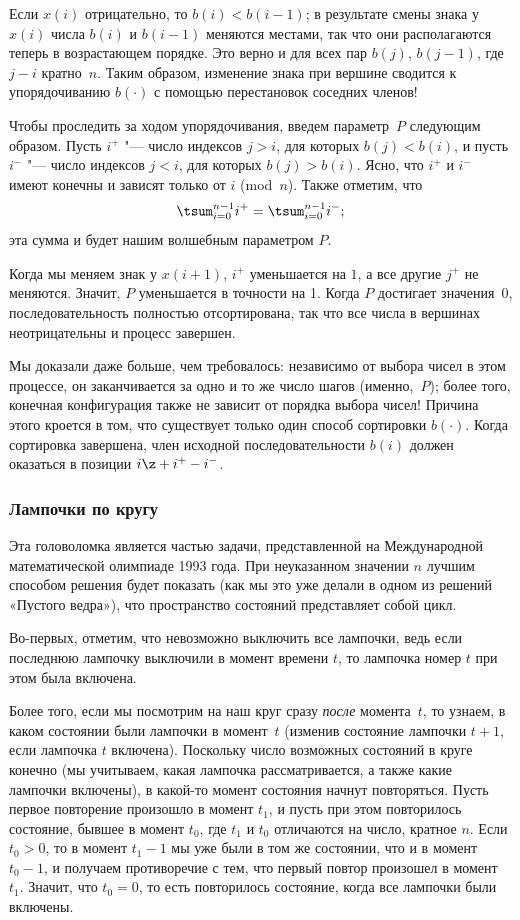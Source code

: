 \documentclass[twoside]{book}
\begin{document}
Если $x(i)$ отрицательно, то $b(i) < b(i-1)$; в результате смены знака
у $x(i)$ числа $b(i)$ и $b(i - 1)$ меняются местами, так что они располагаются теперь в возрастающем порядке.
Это верно и для всех пар $b(j)$, $b(j - 1)$, где $j-i$ кратно~$n$.
Таким образом, изменение знака при вершине сводится к упорядочиванию $b(\cdot)$ с помощью перестановок соседних членов!

Чтобы проследить за ходом упорядочивания, введем параметр~$P$ следующим образом.
Пусть $i^+$ "--- число индексов $j > i$, для которых $b(j) < b(i)$, и
пусть $i^-$ "--- число индексов $j < i$, для которых $b(j) >
b(i)$.
Ясно, что $i^+$ и $i^-$ имеют конечны и зависят только от $i$ (mod~$n$).
Также отметим, что 
\[ \tsum_{i=0}^{n-1}i^+= \tsum_{i=0}^{n-1}i^-;
\]
эта сумма и будет нашим волшебным параметром $P$.

Когда мы меняем знак у $x(i+1)$, $i^+$ уменьшается на $1$, а все другие $j^+$ не меняются.
Значит, $P$ уменьшается в точности на 1.
Когда $P$ достигает значения~$0$, последовательность полностью отсортирована, так что все числа в вершинах неотрицательны и процесс завершен.

Мы доказали даже больше, чем требовалось: независимо от выбора чисел в
этом процессе, он заканчивается за одно и то же число шагов
(именно,~$P$); более того, конечная конфигурация также не зависит от
порядка выбора чисел!  Причина этого кроется в том, что существует
только один способ сортировки $b(\cdot)$.
Когда сортировка завершена,
член исходной последовательности $b(i)$ должен оказаться в позиции $i
\z+ i^+ - i^-$. \heart

\subsubsection*{Лампочки по кругу}%

Эта головоломка является частью задачи, представленной на Международной математической олимпиаде 1993 года.
При неуказанном значении $n$ лучшим способом решения будет показать
(как мы это уже делали в одном из решений «Пустого ведра»), что
пространство состояний представляет собой цикл.

\medskip

Во-первых, отметим, что невозможно выключить все лампочки,
ведь если последнюю лампочку выключили в момент времени $t$, то
лампочка номер $t$ при этом была включена.

Более того, если мы посмотрим на наш круг сразу \emph{после} момента~$t$, то узнаем, в каком состоянии были лампочки в момент~$t$ (изменив состояние лампочки $t+1$, если лампочка $t$ включена).
Поскольку число возможных состояний в круге конечно (мы учитываем,
какая лампочка рассматривается, а также какие лампочки включены),  в
какой-то момент состояния начнут повторяться.
Пусть первое повторение произошло в момент $t_1$, и пусть при этом повторилось состояние, бывшее в момент $t_0$, где $t_1$ и $t_0$ отличаются на число, кратное $n$.
Если $t_0>0$, то в момент $t_1 - 1$ мы уже были в том же состоянии,
что и в момент $t_0 - 1$, и получаем противоречие с тем, что первый
повтор произошел в момент~$t_1$.
Значит, что $t_0=0$, то есть повторилось состояние, когда все лампочки были включены.
\heart
\end{document}

